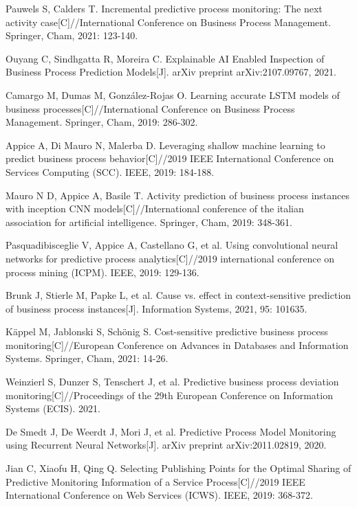 \documentclass[runningheads]{llncs}
\begin{document}
\begin{thebibliography}{99}
	Pauwels S, Calders T. Incremental predictive process monitoring: The next activity case[C]//International Conference on Business Process Management. Springer, Cham, 2021: 123-140.
	
	Ouyang C, Sindhgatta R, Moreira C. Explainable AI Enabled Inspection of Business Process Prediction Models[J]. arXiv preprint arXiv:2107.09767, 2021.
	
	Camargo M, Dumas M, González-Rojas O. Learning accurate LSTM models of business processes[C]//International Conference on Business Process Management. Springer, Cham, 2019: 286-302.
	
	Appice A, Di Mauro N, Malerba D. Leveraging shallow machine learning to predict business process behavior[C]//2019 IEEE International Conference on Services Computing (SCC). IEEE, 2019: 184-188.
	
	Mauro N D, Appice A, Basile T. Activity prediction of business process instances with inception CNN models[C]//International conference of the italian association for artificial intelligence. Springer, Cham, 2019: 348-361.
	
	Pasquadibisceglie V, Appice A, Castellano G, et al. Using convolutional neural networks for predictive process analytics[C]//2019 international conference on process mining (ICPM). IEEE, 2019: 129-136.
	
	Brunk J, Stierle M, Papke L, et al. Cause vs. effect in context-sensitive prediction of business process instances[J]. Information Systems, 2021, 95: 101635.
	
	Käppel M, Jablonski S, Schönig S. Cost-sensitive predictive business process monitoring[C]//European Conference on Advances in Databases and Information Systems. Springer, Cham, 2021: 14-26.
	
	Weinzierl S, Dunzer S, Tenschert J, et al. Predictive business process deviation monitoring[C]//Proceedings of the 29th European Conference on Information Systems (ECIS). 2021.
	
	De Smedt J, De Weerdt J, Mori J, et al. Predictive Process Model Monitoring using Recurrent Neural Networks[J]. arXiv preprint arXiv:2011.02819, 2020.
	
	Jian C, Xiaofu H, Qing Q. Selecting Publishing Points for the Optimal Sharing of Predictive Monitoring Information of a Service Process[C]//2019 IEEE International Conference on Web Services (ICWS). IEEE, 2019: 368-372.
	

\end{thebibliography}
\end{document}
